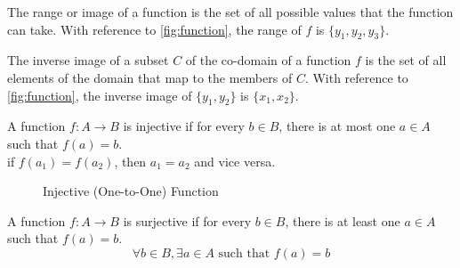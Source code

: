 \begin{definition}
    [Range]
    The range or image of a function is the set of all possible values that the function can take. With reference to \ref{fig:function}, the range of $f$ is $\{y_1,y_2,y_3\}$.
\end{definition}

\begin{definition}
    The inverse image of a subset $C$ of the co-domain of a function $f$ is the set of all elements of the domain that map to the members of $C$. With reference to \ref{fig:function}, the inverse image of $\{y_1,y_2\}$ is $\{x_1,x_2\}$.
\end{definition}

\begin{definition}
    A function $f:A \to B$ is injective if for every $b \in B$, there is at most one $a \in A$ such that $f(a) = b$. \\
    if $f(a_1) = f(a_2)$, then $a_1 = a_2$ and vice versa.
\end{definition}

\begin{figure}[h]
    \centering
    \caption{Injective (One-to-One) Function}
    \label{fig:injective}
\end{figure}

\begin{definition}
    A function $f:A \to B$ is surjective if for every $b \in B$, there is at least one $a \in A$ such that $f(a) = b$.
    \[
        \forall b \in B, \exists a \in A \text{ such that } f(a) = b
    \]

\end{definition}

